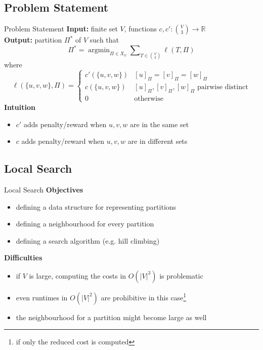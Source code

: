 \documentclass[10pt]{beamer}
\newcommand{\R}{\mathbb{R}}
\DeclareMathOperator*{\argmin}{\arg\min}
\begin{document}
\subsection*{Problem Statement}
\begin{frame}{Problem Statement}
    \textbf{Input:} finite set $V$, functions $c,c': \binom{V}{3} \rightarrow \R$ \\
    \textbf{Output:} partition $\Pi^*$ of $V$ such that $$ \Pi^* = \argmin_{\Pi \in X_V} \sum\nolimits_{T \in \binom{V}{3}} \ell(T, \Pi) $$
    where $$ \ell(\{u,v,w\}, \Pi) = \begin{cases}
        c'(\{u,v,w\}) & [u]_\Pi = [v]_\Pi = [w]_\Pi \\
        c(\{u,v,w\}) &  [u]_\Pi, [v]_\Pi, [w]_\Pi \text{ pairwise distinct} \\
        0 & \text{otherwise}
    \end{cases} $$
    \pause
    \textbf{Intuition}
    \begin{itemize}
        \item $c'$ adds penalty/reward when $u,v,w$ are in the same set 
        \item $c$ adds penalty/reward when $u,v,w$ are in different sets 
    \end{itemize}
\end{frame}

\subsection*{Local Search}
\begin{frame}{Local Search}
    \textbf{Objectives}
    \begin{itemize}
        \item defining a data structure for representing partitions
        \item defining a neighbourhood for every partition
        \item defining a search algorithm (e.g. hill climbing)
    \end{itemize}
    \pause 
    \textbf{Difficulties}
    \begin{itemize}
        \item if $V$ is large, computing the costs in $O(|V|^3)$ is problematic
        \item even runtimes in $O(|V|^2)$ are prohibitive in this case\footnote{if only the reduced cost is computed}
        \item the neighbourhood for a partition might become large as well
    \end{itemize}
\end{frame}
\end{document}
